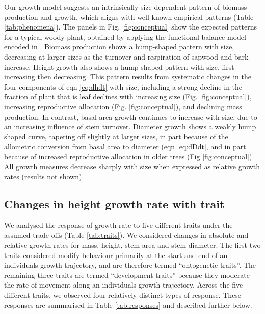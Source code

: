 \documentclass[a4paper,11pt]{article}
\begin{document}
Our growth model suggests an intrinsically size-dependent pattern of biomass-production and growth, which aligns with well-known empirical patterns (Table \ref{tab:phenomena}). The panels in Fig. \ref{fig:conceptual} show the expected patterns for a typical woody plant, obtained by applying the functional-balance model encoded in {\plant}. Biomass production shows a hump-shaped pattern with size, decreasing at larger sizes as the turnover and respiration of sapwood and bark increase. Height growth also shows a hump-shaped pattern with size, first increasing then decreasing. This pattern results from systematic changes in the four components of eqn \ref{eq:dhdt} with size, including a strong decline in the fraction of plant that is leaf declines with increasing size (Fig. \ref{fig:conceptual}), increasing reproductive allocation (Fig. \ref{fig:conceptual}), and declining mass production. In contrast, basal-area growth continues to increase with size, due to an increasing influence of stem turnover. Diameter growth shows a weakly hump shaped curve, tapering off slightly at larger sizes, in part because of the allometric conversion from basal area to diameter (eqn \ref{eq:dDdt}, and in part because of increased reproductive allocation in older trees (Fig \ref{fig:conceptual}). All growth measures decrease sharply with size when expressed as relative growth rates (results not shown).


\subsection{Changes in height growth rate with trait}

We analysed the response of growth rate to five different traits under the assumed trade-offs (Table \ref{tab:traits}). We considered changes in absolute and relative growth rates for mass, height, stem area and stem diameter. The first two traits considered modify behaviour primarily at the start and end of an individuals growth trajectory, and are therefore termed ``ontogenetic traits''. The remaining three traits are termed ``development traits'' because they moderate the rate of movement along an individuals growth trajectory. Across the five different traits, we observed four relatively distinct types of response. These responses are summarised in Table \ref{tab:responses} and described further below.
\end{document}

